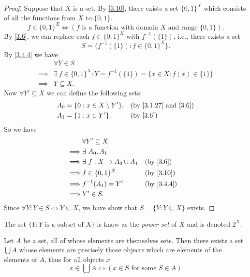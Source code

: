 \begin{proof}
  Suppose that \(X\) is a set.
  By \cref{3.10}, there exists a set \(\{0, 1\}^X\) which consists of all the functions from \(X\) to \(\{0, 1\}\).
  \[
    f \in \{0, 1\}^X \iff (f \text{ is a function with domain } X \text{ and range } \{0, 1\}).
  \]
  By \cref{3.6}, we can replace each \(f \in \{0, 1\}^X\) with \(f^{-1}(\{1\})\), i.e., there exists a set
  \[
    S = \{f^{-1}(\{1\}) : f \in \{0, 1\}^X\}.
  \]
  By \cref{3.4.4} we have
  \begin{align*}
             & \forall Y \in S                                                              \\
    \implies & \exists\ f \in \{0, 1\}^X : Y = f^{-1}(\{1\}) = \{x \in X : f(x) \in \{1\}\} \\
    \implies & Y \subseteq X.
  \end{align*}
  Now \(\forall Y' \subseteq X\) we can define the following sets:
  \begin{align*}
    A_0 & = \{0 : x \in X \setminus Y'\}. &  & \text{(by \cref{3.1.27} and \cref{3.6})} \\
    A_1 & = \{1 : x \in Y'\}.             &  & \text{(by \cref{3.6})}
  \end{align*}
  So we have
  \begin{align*}
             & \forall Y' \subseteq X                                        \\
    \implies & \exists\ A_0, A_1                                             \\
    \implies & \exists\ f : X \to A_0 \cup A_1 &  & \text{(by \cref{3.6})}   \\
    \implies & f \in \{0, 1\}^X                &  & \text{(by \cref{3.10})}  \\
    \implies & f^{-1}(A_1) = Y'                &  & \text{(by \cref{3.4.4})} \\
    \implies & Y' \in S.
  \end{align*}
  Since \(\forall Y : Y \in S \iff Y \subseteq X\), we have show that \(S = \{Y : Y \subseteq X\}\) exists.
\end{proof}

\begin{rmk}\label{3.4.10}
  The set \(\{Y : Y \text{ is a subset of } X\}\) is know as the \emph{power set} of \(X\) and is denoted \(2^X\).
\end{rmk}

\begin{ax}[Union]\label{3.11}
  Let \(A\) be a set, all of whose elements are themselves sets.
  Then there exists a set \(\bigcup A\) whose elements are precisely those objects which are elements of the elements of \(A\), thus for all objects \(x\)
  \[
    x \in \bigcup A \iff (x \in S \text{ for some } S \in A)
  \]
\end{ax}

